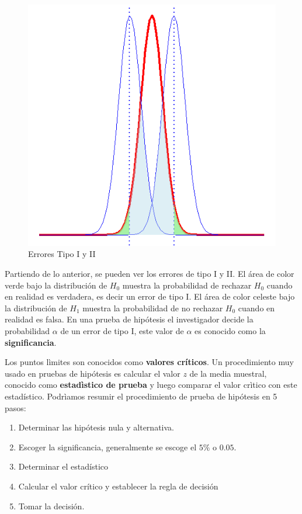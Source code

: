 \documentclass[]{book}
\providecommand{\tightlist}{%
  \setlength{\itemsep}{0pt}\setlength{\parskip}{0pt}}
\begin{document}
\begin{figure}[h]

{\centering \includegraphics[width=0.5\linewidth]{phtest} 

}

\caption{Errores Tipo I y II}\label{fig:pht}
\end{figure}

Partiendo de lo anterior, se pueden ver los errores de tipo I y II. El
área de color verde bajo la distribución de \(H_0\) muestra la
probabilidad de rechazar \(H_0\) cuando en realidad es verdadera, es
decir un error de tipo I. El área de color celeste bajo la distribución
de \(H_1\) muestra la probabilidad de no rechazar \(H_0\) cuando en
realidad es falsa. En una prueba de hipótesis el investigador decide la
probabilidad \(\alpha\) de un error de tipo I, este valor de \(\alpha\)
es conocido como la \textbf{significancia}.

Los puntos lìmites son conocidos como \textbf{valores críticos}. Un
procedimiento muy usado en pruebas de hipótesis es calcular el valor
\(z\) de la media muestral, conocido como \textbf{estadìstico de prueba}
y luego comparar el valor crìtico con este estadístico. Podrìamos
resumir el procedimiento de prueba de hipótesis en 5 pasos:

\begin{enumerate}
\def\labelenumi{\arabic{enumi}.}
\tightlist
\item
  Determinar las hipótesis nula y alternativa.
\item
  Escoger la significancia, generalmente se escoge el \(5\%\) o
  \(0.05\).
\item
  Determinar el estadístico
\item
  Calcular el valor crítico y establecer la regla de decisión
\item
  Tomar la decisión.
\end{enumerate}
\end{document}
